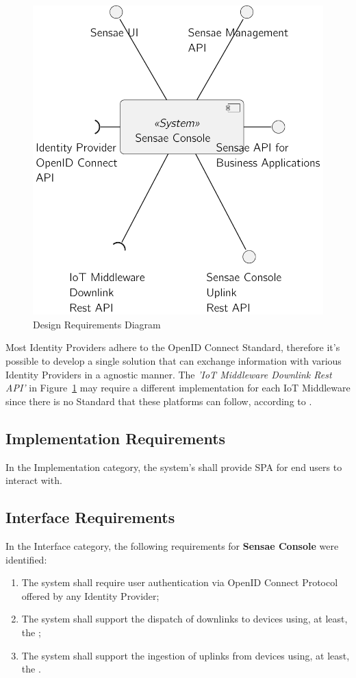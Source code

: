 \begin{figure}[H]
    \centering
    \includegraphics[page=1,width=0.5\columnwidth]{assets/diagrams/design/architectural/level1/logical-view-v2.pdf}
    \caption[Design Requirements Diagram]{Design Requirements Diagram}
    \label{fig:requirements:non_functional:design}
\end{figure}

Most Identity Providers adhere to the OpenID Connect Standard, therefore it's possible to develop a single solution that can exchange information with various Identity Providers in a agnostic manner.
The \textit{'\gls{IoT} Middleware Downlink Rest API'} in Figure~\ref{fig:requirements:non_functional:design} may require a different implementation for each \gls{IoT} Middleware since there is no Standard that these platforms can follow, according to \cite{KOO20224191}.  

\subsection{Implementation Requirements}
\label{subsec:requirements:non_functional:implementation}

In the Implementation category, the system's shall provide \gls{SPA} for end users to interact with.

\subsection{Interface Requirements}
\label{subsec:requirements:non_functional:interface}

In the Interface category, the following requirements for \textbf{Sensae Console} were identified:

\begin{enumerate}
    \item The system shall require user authentication via OpenID Connect Protocol offered by any Identity Provider;
    \item The system shall support the dispatch of downlinks to devices using, at least, the ;
    \item The system shall support the ingestion of uplinks from devices using, at least, the .
\end{enumerate}

